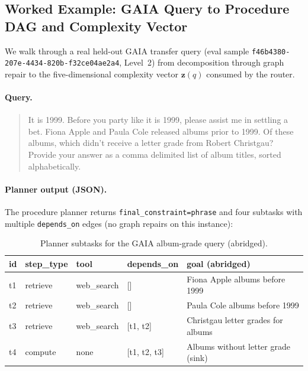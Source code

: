\subsection{Worked Example: GAIA Query to Procedure DAG and Complexity Vector}
\label{app:gaia-worked-example}

We walk through a real held-out GAIA transfer query (eval sample
\texttt{f46b4380-207e-4434-820b-f32ce04ae2a4}, Level~2) from decomposition through graph repair to
the five-dimensional complexity vector $\mathbf{z}(q)$ consumed by the router.

\paragraph{Query.}
\begin{quote}\small
It is 1999. Before you party like it is 1999, please assist me in settling a bet.
Fiona Apple and Paula Cole released albums prior to 1999. Of these albums, which didn't receive
a letter grade from Robert Christgau? Provide your answer as a comma delimited list of album titles,
sorted alphabetically.
\end{quote}

\paragraph{Planner output (JSON).}
The procedure planner returns \texttt{final\_constraint=phrase} and four subtasks with
multiple \texttt{depends\_on} edges (no graph repairs on this instance):

\begin{table}[h]
  \centering
  \footnotesize
  \caption{Planner subtasks for the GAIA album-grade query (abridged).}
  \label{tab:gaia-subtasks}
  \begin{tabular}{@{}lllll@{}}
    \toprule
    id & step\_type & tool & depends\_on & goal (abridged) \\
    \midrule
    t1 & retrieve & web\_search & [] & Fiona Apple albums before 1999 \\
    t2 & retrieve & web\_search & [] & Paula Cole albums before 1999 \\
    t3 & retrieve & web\_search & [t1, t2] & Christgau letter grades for albums \\
    t4 & compute & none & [t1, t2, t3] & Albums without letter grade (sink) \\
    \bottomrule
  \end{tabular}
\end{table}

